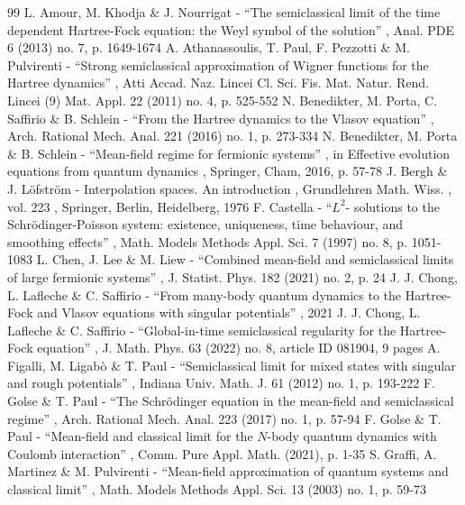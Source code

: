 \documentclass[11pt]{article}
\theoremstyle{definition}
\renewcommand {\(} {\lt(}
\renewcommand {\)} {\rt)}
\begin{document}
\begin{thebibliography}{99}
 L. Amour, M. Khodja \& J. Nourrigat - “The semiclassical limit of the time dependent Hartree-Fock equation: the Weyl symbol of the solution” , Anal. PDE 6 (2013) no. 7, p. 1649-1674
 A. Athanassoulis, T. Paul, F. Pezzotti \& M. Pulvirenti - “Strong semiclassical approximation of Wigner functions for the Hartree dynamics” , Atti Accad. Naz. Lincei Cl. Sci. Fis. Mat. Natur. Rend. Lincei (9) Mat. Appl. 22 (2011) no. 4, p. 525-552
 N. Benedikter, M. Porta, C. Saffirio \& B. Schlein - “From the Hartree dynamics to the Vlasov equation” , Arch. Rational Mech. Anal. 221 (2016) no. 1, p. 273-334
 N. Benedikter, M. Porta \& B. Schlein - “Mean-field regime for fermionic systems” , in Effective evolution equations from quantum dynamics , Springer, Cham, 2016, p. 57-78
 J. Bergh \& J. Löfström - Interpolation spaces. An introduction , Grundlehren Math. Wiss. , vol. 223 , Springer, Berlin, Heidelberg, 1976
 F. Castella - “$L^2$- solutions to the Schrödinger-Poisson system: existence, uniqueness, time behaviour, and smoothing effects” , Math. Models Methods Appl. Sci. 7 (1997) no. 8, p. 1051-1083
 L. Chen, J. Lee \& M. Liew - “Combined mean-field and semiclassical limits of large fermionic systems” , J. Statist. Phys. 182 (2021) no. 2, p. 24
 J. J. Chong, L. Lafleche \& C. Saffirio - “From many-body quantum dynamics to the Hartree-Fock and Vlasov equations with singular potentials” , 2021
 J. J. Chong, L. Lafleche \& C. Saffirio - “Global-in-time semiclassical regularity for the Hartree-Fock equation” , J. Math. Phys. 63 (2022) no. 8, article ID 081904, 9 pages
 A. Figalli, M. Ligabò \& T. Paul - “Semiclassical limit for mixed states with singular and rough potentials” , Indiana Univ. Math. J. 61 (2012) no. 1, p. 193-222
 F. Golse \& T. Paul - “The Schrödinger equation in the mean-field and semiclassical regime” , Arch. Rational Mech. Anal. 223 (2017) no. 1, p. 57-94
 F. Golse \& T. Paul - “Mean-field and classical limit for the $N$-body quantum dynamics with Coulomb interaction” , Comm. Pure Appl. Math. (2021), p. 1-35
 S. Graffi, A. Martinez \& M. Pulvirenti - “Mean-field approximation of quantum systems and classical limit” , Math. Models Methods Appl. Sci. 13 (2003) no. 1, p. 59-73

\end{thebibliography}
\end{document}
